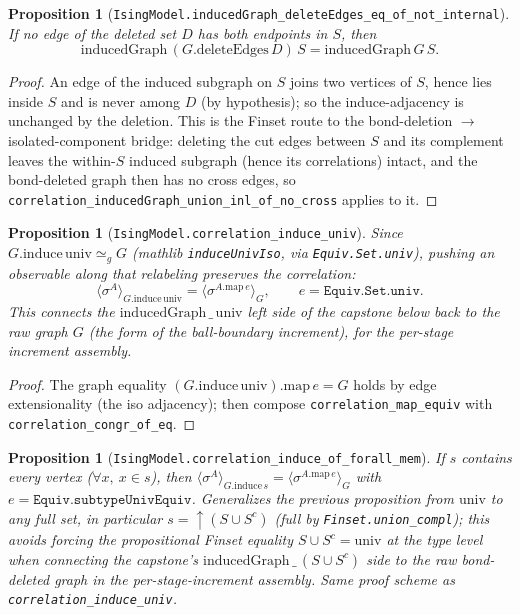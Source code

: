 \documentclass[a4paper,11pt]{article}
\newtheorem{proposition}[theorem]{Proposition}
\begin{document}
\begin{proposition}[\texttt{IsingModel.inducedGraph\_deleteEdges\_eq\_of\_not\_internal}]
If no edge of the deleted set $D$ has both endpoints in $S$, then
\[
  \mathrm{inducedGraph}\,(G.\mathrm{deleteEdges}\,D)\,S
    = \mathrm{inducedGraph}\,G\,S.
\]
\end{proposition}

\begin{proof}
An edge of the induced subgraph on $S$ joins two vertices of $S$, hence lies
inside $S$ and is never among $D$ (by hypothesis); so the induce-adjacency is
unchanged by the deletion. This is the Finset route to the bond-deletion
$\to$ isolated-component bridge: deleting the cut edges between $S$ and its
complement leaves the within-$S$ induced subgraph (hence its correlations)
intact, and the bond-deleted graph then has no cross edges, so
\texttt{correlation\_inducedGraph\_union\_inl\_of\_no\_cross} applies to it.
\end{proof}

\begin{proposition}[\texttt{IsingModel.correlation\_induce\_univ}]
Since $G.\mathrm{induce}\,\mathrm{univ}\simeq_g G$ (mathlib \texttt{induceUnivIso},
via \texttt{Equiv.Set.univ}), pushing an observable along that relabeling
preserves the correlation:
\[
  \langle\sigma^{A}\rangle_{G.\mathrm{induce}\,\mathrm{univ}}
    = \langle\sigma^{A.\mathrm{map}\,e}\rangle_{G},\qquad e=\texttt{Equiv.Set.univ}.
\]
This connects the $\mathrm{inducedGraph}\,\_\,\mathrm{univ}$ left side of the
capstone below back to the raw graph $G$ (the form of the ball-boundary
increment), for the per-stage increment assembly.
\end{proposition}

\begin{proof}
The graph equality $(G.\mathrm{induce}\,\mathrm{univ}).\mathrm{map}\,e = G$ holds
by edge extensionality (the iso adjacency); then compose
\texttt{correlation\_map\_equiv} with \texttt{correlation\_congr\_of\_eq}.
\end{proof}

\begin{proposition}[\texttt{IsingModel.correlation\_induce\_of\_forall\_mem}]
If $s$ contains every vertex ($\forall x,\ x\in s$), then
$\langle\sigma^{A}\rangle_{G.\mathrm{induce}\,s}
  = \langle\sigma^{A.\mathrm{map}\,e}\rangle_{G}$ with
$e=\texttt{Equiv.subtypeUnivEquiv}$. Generalizes the previous proposition from
$\mathrm{univ}$ to any full set, in particular $s=\uparrow(S\cup S^{c})$ (full by
\texttt{Finset.union\_compl}); this avoids forcing the propositional Finset
equality $S\cup S^{c}=\mathrm{univ}$ at the type level when connecting the
capstone's $\mathrm{inducedGraph}\,\_\,(S\cup S^{c})$ side to the raw bond-deleted
graph in the per-stage-increment assembly. Same proof scheme as
\texttt{correlation\_induce\_univ}.
\end{proposition}
\end{document}
